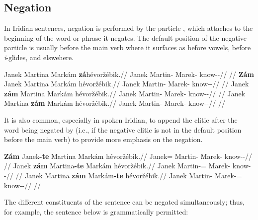 \subsection{Negation}

In Iridian sentences, negation is performed by the particle , which attaches to the beginning of the word or phrase  it negates. The default position of the negative particle is usually before the main verb where it surfaces as  before vowels,  before \emph{i}-glides, and  elswehere.

\pex
\a
\begingl
    \gla Janek Martina Markám \textbf{zá}hévoržébik.//
    \glb Janek Martin-\Pat{} Marek-\Agt{} \Neg{}know-\Ben{}-\Pf{}//
    \glft {}//
\endgl
\a
\begingl
    \gla \textbf{Zám} Janek Martina Markám hévoržébik.//
    \glb \Neg{} Janek Martin-\Pat{} Marek-\Agt{} know-\Ben{}-\Pf{}//
    \glft {}//
\endgl
\a
\begingl
    \gla Janek \textbf{zám} Martina Markám hévoržébik.//
    \glb Janek \Neg{} Martin-\Pat{} Marek-\Agt{} know-\Ben{}-\Pf{}//
    \glft {}//
\endgl
\a
\begingl
    \gla Janek Martina \textbf{zám} Markám hévoržébik.//
    \glb Janek Martin-\Pat{} \Neg{} Marek-\Agt{} know-\Ben{}-\Pf{}//
    \glft {}//
\endgl
\xe

It is also common, especially in spoken Iridian, to append the clitic 
after the word being negated by  (i.e., if the negative clitic is not
in the default position before the main verb) to provide more emphasis on the
negation.

\pex
\a
\begingl
    \gla \textbf{Zám} Janek\textbf{-te} Martina Markám hévoržébik.//
    \glb \Neg{} Janek=\Foc{} Martin-\Pat{} Marek-\Agt{} know-\Ben{}-\Pf{}//
    \glft {}//
\endgl
\a
\begingl
    \gla Janek \textbf{zám} Martina\textbf{-te} Markám hévoržébik.//
    \glb Janek \Neg{} Martin-\Pat{}=\Foc{} Marek-\Agt{} know-\Ben{}-\Pf{}//
    \glft {}//
\endgl
\a
\begingl
    \gla Janek Martina \textbf{zám} Markám\textbf{-te} hévoržébik.//
    \glb Janek Martin-\Pat{} \Neg{} Marek-\Agt{}=\Foc{} know-\Ben{}-\Pf{}//
    \glft {}//
\endgl
\xe

The different constituents of the sentence can be negated simultaneously; thus,
for example, the sentence below is grammatically permitted:

